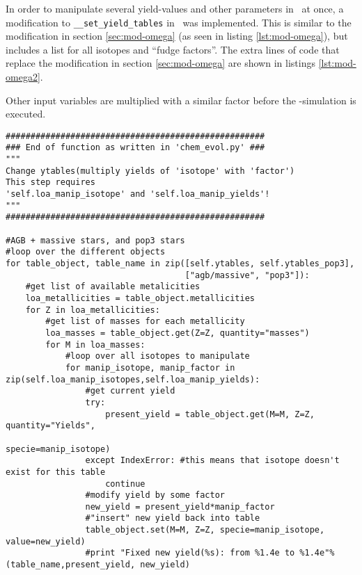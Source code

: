 \label{sec:mod-omega2}

In order to manipulate several yield-values and other parameters in \omegamodel\ at once, a modification to \verb|__set_yield_tables| in \chemevol\ was implemented.
This is similar to the modification in section \ref{sec:mod-omega} (as seen in listing \ref{lst:mod-omega}), but includes a list for all isotopes and ``fudge factors''.
The extra lines of code that replace the modification in section \ref{sec:mod-omega} are shown in listings \ref{lst:mod-omega2}.

Other input variables are multiplied with a similar factor before the \omegamodel-simulation is executed.

\begin{lstlisting}[style=custompython, caption={\label{lst:mod-omega2}Snippet of code added to the existing function \texttt{\_\_set\_yield\_tables} in \chemevol\ in \omegamodel-framework. The code-snippet multiplies the yield of a list of isotopes, \texttt{self.loa\_manip\_isotope}, with a corresponding factor from a list of factors \texttt{self.loa\_manip\_yields} for all yield-tables where the isotopes can be found.}]
####################################################
### End of function as written in 'chem_evol.py' ###
""" 
Change ytables(multiply yields of 'isotope' with 'factor')
This step requires 
'self.loa_manip_isotope' and 'self.loa_manip_yields'!
"""
####################################################

#AGB + massive stars, and pop3 stars
#loop over the different objects
for table_object, table_name in zip([self.ytables, self.ytables_pop3],
                                    ["agb/massive", "pop3"]):
    #get list of available metalicities
    loa_metallicities = table_object.metallicities
    for Z in loa_metallicities:
        #get list of masses for each metallicity
        loa_masses = table_object.get(Z=Z, quantity="masses")
        for M in loa_masses:
            #loop over all isotopes to manipulate
            for manip_isotope, manip_factor in zip(self.loa_manip_isotopes,self.loa_manip_yields):
                #get current yield 
                try:
                    present_yield = table_object.get(M=M, Z=Z, quantity="Yields",
                                                     specie=manip_isotope)
                except IndexError: #this means that isotope doesn't exist for this table
                    continue
                #modify yield by some factor
                new_yield = present_yield*manip_factor 
                #"insert" new yield back into table
                table_object.set(M=M, Z=Z, specie=manip_isotope, value=new_yield)
                #print "Fixed new yield(%s): from %1.4e to %1.4e"%(table_name,present_yield, new_yield)


\end{lstlisting}

